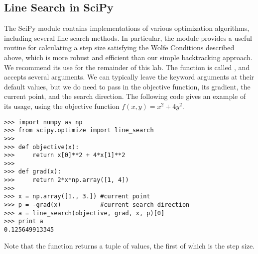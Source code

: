 \subsection*{Line Search in SciPy}
The SciPy module  contains implementations of various optimization algorithms, including several line search methods.
In particular, the module provides a useful routine for calculating a step size satisfying the Wolfe Conditions described above, which is more robust and efficient than our simple backtracking approach.
We recommend its use for the remainder of this lab.
The function is called , and accepts several arguments.
We can typically leave the keyword arguments at their default values, but we do need to pass in the objective function, its gradient, the current point, and the search direction.
The following code gives an example of its usage, using the objective function $f(x, y) = x^2+4y^2$.
\begin{lstlisting}
>>> import numpy as np
>>> from scipy.optimize import line_search
>>>
>>> def objective(x):
>>>     return x[0]**2 + 4*x[1]**2
>>>
>>> def grad(x):
>>>     return 2*x*np.array([1, 4])
>>>
>>> x = np.array([1., 3.]) #current point
>>> p = -grad(x)           #current search direction
>>> a = line_search(objective, grad, x, p)[0]
>>> print a
0.125649913345
\end{lstlisting}
Note that the function returns a tuple of values, the first of which is the step size.

